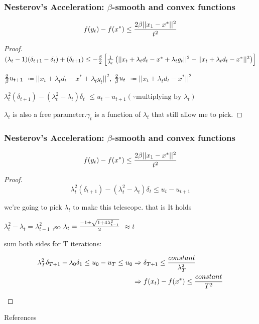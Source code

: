 \begin{frame}\frametitle{ Nesterov’s Acceleration: $\beta$-smooth and convex functions}
$$f(y_t)-f(x^*) \leq {2\beta ||x_1-x^*||^2 \over t^2}$$
\begin{proof}
$(\lambda_t - 1)(\delta_{t+1} - \delta_{t}) + (\delta_{t+1}) \leq -{\beta \over 2}\left[{1 \over \lambda_t}\left(||x_t+\lambda_t d_t-x^*+\lambda_t g_t||^2-||x_t+\lambda_t d_t - x^*||^2\right)\right]$

\begin{center}
    

${2 \over \beta}u_{t+1}$ $\coloneqq ||x_t+\lambda_t d_t-x^*+\lambda_t g_t||^2$, ${2 \over \beta}u_t$ $\coloneqq ||x_t+\lambda_t d_t - x^*||^2$



$\lambda_t^2(\delta_{t+1}) - (\lambda_t^2-\lambda_t)\delta_t$ $\leq u_t - u_{t+1} (\because{\text{multiplying by } \lambda_t})$

\end{center}
 $\lambda_t$ is also a free parameter.$\gamma_t$ is a function of $\lambda_t$ that still allow me to pick.
\end{proof}
\end{frame}

\begin{frame}\frametitle{ Nesterov’s Acceleration: $\beta$-smooth and convex functions}
\begin{spacing}{0.5}
\end{spacing}
$$f(y_t)-f(x^*) \leq {2\beta ||x_1-x^*||^2 \over t^2}$$
\begin{proof}

$$\lambda_t^2(\delta_{t+1}) - (\lambda_t^2-\lambda_t)\delta_t \leq u_t - u_{t+1}$$

we're going to pick $\lambda_t$ to make this telescope. that is It holds
\begin{center}
    

$\lambda_t^2 - \lambda_t=\lambda_{t-1}^2$  ,so $\lambda_t = {-1\pm\sqrt{1+4\lambda_{t-1}^2} \over 2}$ $\approx t$ 
\begin{spacing}{2}
\end{spacing}
sum both sides for T iterations:
\begin{spacing}{0.005}
\end{spacing}
\begin{align*}
\lambda_T^2\delta_{T+1}-\lambda_0 \delta_1 \leq u_0 - u_T \leq u_0
&\Rightarrow{\delta_{T+1}\leq {constant \over \lambda_T^2}}\\
&\Rightarrow f(x_t)-f(x^*) \leq {constant\over T^2}
 \end{align*}

 \end{center}
\end{proof}
\end{frame}


\nocite{caramanis2020opt,
        bubeck2015convex}
\begin{frame}[t, allowframebreaks]{References}
    \printbibliography
\end{frame}